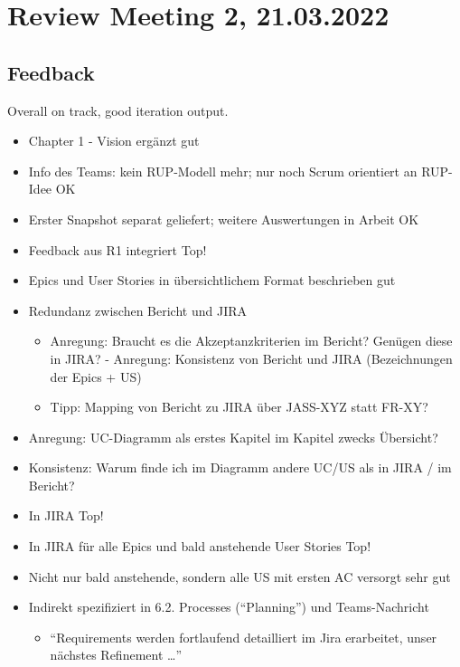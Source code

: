 \section{Review Meeting 2, 21.03.2022}

\subsection{Feedback}
Overall on track, good iteration output.

\begin{itemize}
    \item Chapter 1 - Vision ergänzt \textrightarrow gut
    \item Info des Teams: kein RUP-Modell mehr;
    nur noch Scrum orientiert an RUP-Idee \textrightarrow OK
    \item Erster Snapshot separat geliefert;
    weitere Auswertungen in Arbeit \textrightarrow OK
    \item Feedback aus R1 integriert \textrightarrow Top!
    \item Epics und User Stories in übersichtlichem Format beschrieben \textrightarrow gut
    \item Redundanz zwischen Bericht und JIRA
    \begin{itemize}
        \item Anregung: Braucht es die Akzeptanzkriterien im Bericht?
        Genügen diese in JIRA? - Anregung: Konsistenz von Bericht und JIRA (Bezeichnungen der Epics + US)
        \item Tipp: Mapping von Bericht zu JIRA über JASS-XYZ statt FR-XY?
    \end{itemize}
    \item Anregung: UC-Diagramm als erstes Kapitel im Kapitel zwecks Übersicht?
    \item Konsistenz: Warum finde ich im Diagramm andere UC/US als in JIRA / im Bericht?
    \item In JIRA \textrightarrow Top!
    \item In JIRA für alle Epics und bald anstehende User Stories \textrightarrow Top!
    \item Nicht nur bald anstehende, sondern alle US mit ersten AC versorgt \textrightarrow sehr gut
    \item Indirekt spezifiziert in 6.2. Processes (``Planning'') und Teams-Nachricht
    \begin{itemize}
        \item ``Requirements werden fortlaufend detailliert im Jira erarbeitet, unser nächstes Refinement \ldots''

\end{itemize}
\end{itemize}
